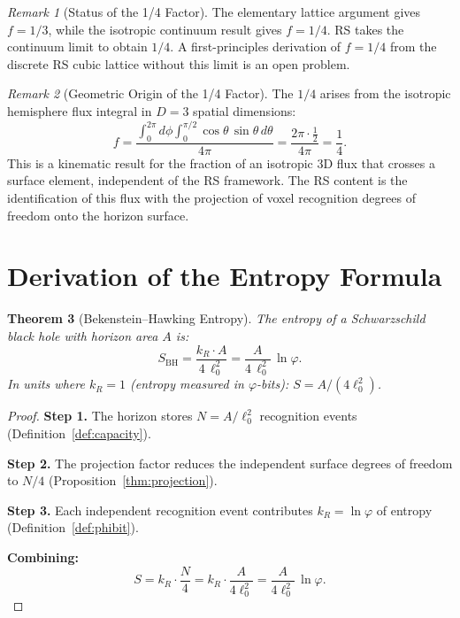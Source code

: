 \documentclass[12pt,a4paper]{article}
\newtheorem{theorem}{Theorem}[section]
\theoremstyle{definition}
\theoremstyle{remark}
\newtheorem{remark}[theorem]{Remark}
\begin{document}
\begin{remark}[Status of the 1/4 Factor]
The elementary lattice argument gives $f = 1/3$, while the isotropic
continuum result gives $f = 1/4$.  RS takes the continuum limit to
obtain $1/4$.  A first-principles derivation of $f = 1/4$ from the
discrete RS cubic lattice without this limit is an open problem.
\end{remark}

\begin{remark}[Geometric Origin of the 1/4 Factor]
\label{rem:geometric}
The $1/4$ arises from the isotropic hemisphere flux integral
in $D = 3$ spatial dimensions:
\[
  f = \frac{\int_0^{2\pi} d\phi \int_0^{\pi/2} \cos\theta\,
  \sin\theta\,d\theta}{4\pi}
  = \frac{2\pi \cdot \tfrac{1}{2}}{4\pi} = \frac{1}{4}.
\]
This is a kinematic result for the fraction of an isotropic 3D flux
that crosses a surface element, independent of the RS framework.
The RS content is the identification of this flux with the
projection of voxel recognition degrees of freedom onto the
horizon surface.
\end{remark}

\section{Derivation of the Entropy Formula}
\label{sec:derivation}

\begin{theorem}[Bekenstein--Hawking Entropy]
\label{thm:entropy}
The entropy of a Schwarzschild black hole with horizon area
$A$ is:
\begin{equation}
  \boxed{S_{\mathrm{BH}} = \frac{k_R \cdot A}{4\,\ell_0^2}
  = \frac{A}{4\,\ell_0^2}\,\ln\varphi.}
  \label{eq:entropy}
\end{equation}
In units where $k_R = 1$ (entropy measured in $\varphi$-bits):
$S = A/(4\ell_0^2)$.
\end{theorem}

\begin{proof}
\textbf{Step 1.}  The horizon stores $N = A/\ell_0^2$
recognition events (Definition~\ref{def:capacity}).

\textbf{Step 2.}  The projection factor reduces the
independent surface degrees of freedom to $N/4$
(Proposition~\ref{thm:projection}).

\textbf{Step 3.}  Each independent recognition event
contributes $k_R = \ln\varphi$ of entropy
(Definition~\ref{def:phibit}).

\textbf{Combining:}
\begin{equation}
  S = k_R \cdot \frac{N}{4}
  = k_R \cdot \frac{A}{4\ell_0^2}
  = \frac{A}{4\ell_0^2}\,\ln\varphi.
\end{equation}
\end{proof}
\end{document}
